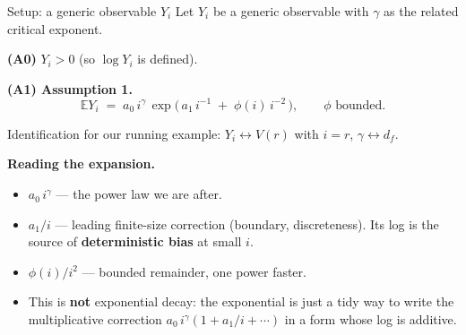 \documentclass[10pt, aspectratio=169, xcolor={table}]{beamer}
\newcommand{\E}{\mathbb{E}}
\begin{document}
\begin{frame}{Setup: a generic observable $Y_i$}
  Let $Y_i$ be a generic observable with $\gamma$ as the related
  critical exponent.

  \vspace{0.4em}
  \textbf{(A0)} $Y_i > 0$ \quad (so $\log Y_i$ is defined).

  \vspace{0.3em}
  \textbf{(A1) Assumption 1.}
  \[
    \E Y_i \;=\; a_0\, i^{\gamma}\,
       \exp\!\Big(\, a_1\, i^{-1}
                  \;+\; \phi(i)\, i^{-2} \,\Big),
    \qquad \phi \text{ bounded.}
  \]

  \vspace{0.4em}
  Identification for our running example:
  $Y_i \leftrightarrow V(r)$ with $i = r$, $\gamma \leftrightarrow d_f$.

  \vspace{0.4em}
  {\footnotesize\textbf{Reading the expansion.}
  \begin{itemize}
    \item $a_0\, i^{\gamma}$ --- the power law we are after.
    \item $a_1 / i$ --- leading finite-size correction (boundary,
          discreteness). Its log is the source of
          \textbf{deterministic bias} at small $i$.
    \item $\phi(i) / i^2$ --- bounded remainder, one power faster.
    \item This is \textbf{not} exponential decay: the exponential is
          just a tidy way to write the multiplicative correction
          $a_0\, i^{\gamma}(1 + a_1/i + \cdots)$ in a form whose log
          is additive.
  \end{itemize}}
\end{frame}
\end{document}
